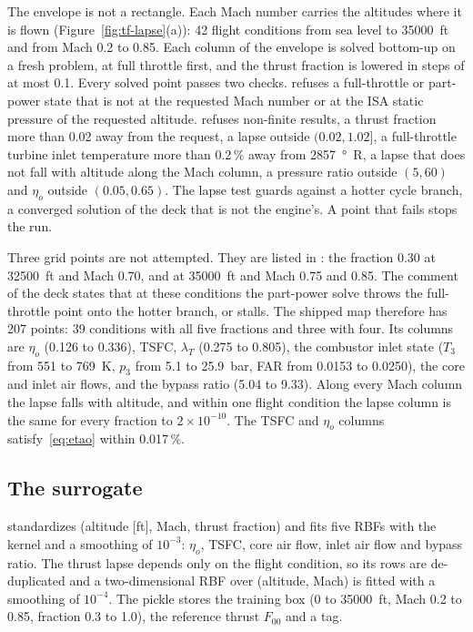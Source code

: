 \documentclass[a4paper,11pt]{article}
\newcommand{\etao}{\eta_{o}}
\begin{document}
The envelope is not a rectangle. Each Mach number carries the altitudes where it is flown
(Figure~\ref{fig:tf-lapse}(a)): 42 flight conditions from sea level to \SI{35000}{ft} and from
Mach 0.2 to 0.85. Each column of the envelope is solved bottom-up on a fresh problem, at full
throttle first, and the thrust fraction is lowered in steps of at most 0.1. Every solved point
passes two checks.  refuses a full-throttle or part-power state that is
not at the requested Mach number or at the ISA static pressure of the requested altitude.
 refuses non-finite results, a thrust fraction more than 0.02 away from the
request, a lapse outside $(0.02, 1.02]$, a full-throttle turbine inlet temperature more than
0.2\,\% away from \SI{2857}{\degree R}, a lapse that does not fall with altitude along the Mach
column, a pressure ratio outside $(5, 60)$ and $\etao$ outside $(0.05, 0.65)$. The lapse test
guards against a hotter cycle branch, a converged solution of the deck that is not the engine's.
A point that fails stops the run.

Three grid points are not attempted. They are listed in : the
fraction 0.30 at \SI{32500}{ft} and Mach 0.70, and at \SI{35000}{ft} and Mach 0.75 and 0.85. The
comment of the deck states that at these conditions the part-power solve throws the
full-throttle point onto the hotter branch, or stalls. The shipped map therefore has 207 points:
39 conditions with all five fractions and three with four. Its columns are $\etao$ (0.126 to
0.336), TSFC, $\lambda_T$ (0.275 to 0.805), the combustor inlet state ($T_3$ from 551 to
\SI{769}{K}, $p_3$ from 5.1 to \SI{25.9}{bar}, FAR from 0.0153 to 0.0250), the core and inlet
air flows, and the bypass ratio (5.04 to 9.33). Along every Mach column the lapse falls with
altitude, and within one flight condition the lapse column is the same for every fraction to
$2\times10^{-10}$. The TSFC and $\etao$ columns satisfy~\eqref{eq:etao} within 0.017\,\%.

\subsection{The surrogate}\label{sec:tf-surrogate}
 standardizes (altitude [ft], Mach, thrust fraction) and fits
five RBFs with the  kernel and a smoothing of $10^{-3}$: $\etao$, TSFC,
core air flow, inlet air flow and bypass ratio. The thrust lapse depends only on the flight
condition, so its rows are de-duplicated and a two-dimensional RBF over (altitude, Mach) is
fitted with a smoothing of $10^{-4}$. The pickle stores the training box (\SI{0}{} to
\SI{35000}{ft}, Mach 0.2 to 0.85, fraction 0.3 to 1.0), the reference thrust $F_{00}$ and a tag.
\end{document}
